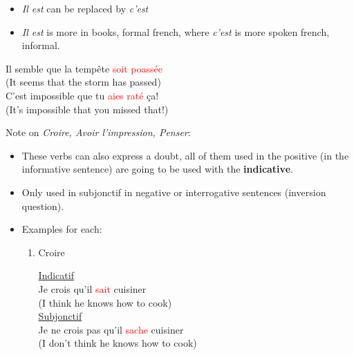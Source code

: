 \documentclass{book}
\begin{document}
\begin{itemize}
\begin{center}
\begin{tabular}{|c|c|}
                    \hline
                \end{tabular}
            \end{center}
            \begin{itemize}
                \item \textit{Il est} can be replaced by \textit{c'est}
                \item \textit{Il est} is more in books, formal french, where \textit{c'est} is more spoken french, informal.
            \end{itemize}
            \begin{center}
                Il semble que la tempête \textcolor{red}{soit poassée} \\
                (It seems that the storm has passed) \\
                C'est impossible que tu \textcolor{red}{aies raté} ça! \\
                (It's impossible that you missed that!)
            \end{center}
            Note on \textit{Croire, Avoir l'impression, Penser}:
            \begin{itemize}
                \item These verbs can also express a doubt, all of them used in the positive (in the informative sentence) are going to be used with the \textbf{indicative}.
                \item Only used in subjonctif in negative or interrogative sentences (inversion question).
                \item Examples for each:
                \begin{enumerate}
                    \item Croire 
                    \begin{center}
                        \underline{Indicatif} \\
                        Je crois qu'il \textcolor{red}{sait} cuisiner \\
                        (I think he knows how to cook) \\
                        \underline{Subjonctif} \\
                        Je ne crois pas qu'il \textcolor{red}{sache} cuisiner \\
                        (I don't think he knows how to cook)
                    \end{center}


\end{enumerate}
\end{itemize}
\end{itemize}
\end{document}
